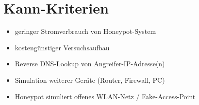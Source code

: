 \section{Kann-Kriterien}
\label{subsec:Kann-Kriterien}
\begin{itemize}
\item geringer Stromverbrauch von Honeypot-System
\item kostengünstiger Versuchsaufbau
\item Reverse DNS-Lookup von Angreifer-IP-Adresse(n)
\item Simulation weiterer Geräte (Router, Firewall, PC)
\item Honeypot simuliert offenes WLAN-Netz / Fake-Access-Point
\end{itemize}



